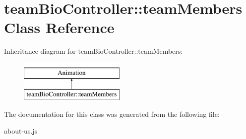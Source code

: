 \hypertarget{classteamBioController_1_1teamMembers}{\section{team\-Bio\-Controller\-:\-:team\-Members Class Reference}
\label{classteamBioController_1_1teamMembers}
}
Inheritance diagram for team\-Bio\-Controller\-:\-:team\-Members\-:\begin{figure}[H]
\begin{center}
\leavevmode
\includegraphics[height=2.000000cm]{classteamBioController_1_1teamMembers}
\end{center}
\end{figure}


The documentation for this class was generated from the following file\-:\begin{DoxyCompactItemize}
\item 
about-\/us.\-js\end{DoxyCompactItemize}
